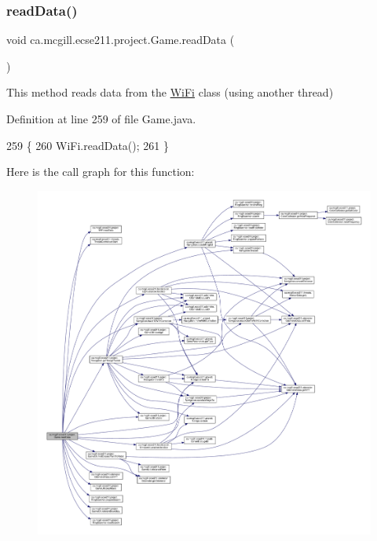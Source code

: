 \subsubsection{\texorpdfstring{read\+Data()}{readData()}}
{\footnotesize\ttfamily void ca.\+mcgill.\+ecse211.\+project.\+Game.\+read\+Data (\begin{DoxyParamCaption}{ }\end{DoxyParamCaption})}

This method reads data from the \hyperlink{enumca_1_1mcgill_1_1ecse211_1_1project_1_1_wi_fi}{Wi\+Fi} class (using another thread) 

Definition at line 259 of file Game.\+java.


\begin{DoxyCode}
259                          \{
260     WiFi.readData();
261   \}
\end{DoxyCode}
Here is the call graph for this function\+:
\nopagebreak
\begin{figure}[H]
\begin{center}
\leavevmode
\includegraphics[width=350pt]{enumca_1_1mcgill_1_1ecse211_1_1project_1_1_game_a032b53e9b16b9d470b461de4a311a698_cgraph}
\end{center}
\end{figure}
\mbox{\label{enumca_1_1mcgill_1_1ecse211_1_1project_1_1_game_a5b304a6a59ddee3f8c7d37bba8a4c129}} 
